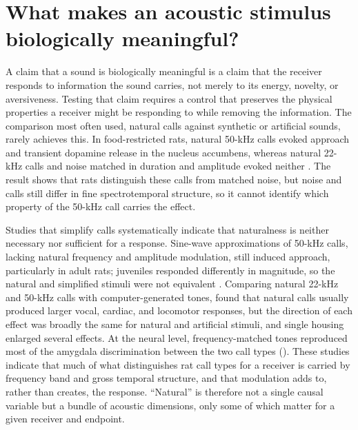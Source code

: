 \section{What makes an acoustic stimulus biologically meaningful?}
\label{sec:q1}


A claim that a sound is biologically meaningful is a claim that the receiver responds to information the sound carries, not merely to its energy, novelty, or aversiveness. Testing that claim requires a control that preserves the physical properties a receiver might be responding to while removing the information. The comparison most often used, natural calls against synthetic or artificial sounds, rarely achieves this. In food-restricted rats, natural 50-kHz calls evoked approach and transient dopamine release in the nucleus accumbens, whereas natural 22-kHz calls and noise matched in duration and amplitude evoked neither \citep{WilluhnEtAl2014}. The result shows that rats distinguish these calls from matched noise, but noise and calls still differ in fine spectrotemporal structure, so it cannot identify which property of the 50-kHz call carries the effect.

Studies that simplify calls systematically indicate that naturalness is neither necessary nor sufficient for a response. Sine-wave approximations of 50-kHz calls, lacking natural frequency and amplitude modulation, still induced approach, particularly in adult rats; juveniles responded differently in magnitude, so the natural and simplified stimuli were not equivalent \citep{WohrSchwarting2007}. Comparing natural 22-kHz and 50-kHz calls with computer-generated tones, \citet{OlszynskiEtAl2020} found that natural calls usually produced larger vocal, cardiac, and locomotor responses, but the direction of each effect was broadly the same for natural and artificial stimuli, and single housing enlarged several effects. At the neural level, frequency-matched tones reproduced most of the amygdala discrimination between the two call types \citep{ParsanaEtAl2012a} (). These studies indicate that much of what distinguishes rat call types for a receiver is carried by frequency band and gross temporal structure, and that modulation adds to, rather than creates, the response. ``Natural'' is therefore not a single causal variable but a bundle of acoustic dimensions, only some of which matter for a given receiver and endpoint.

